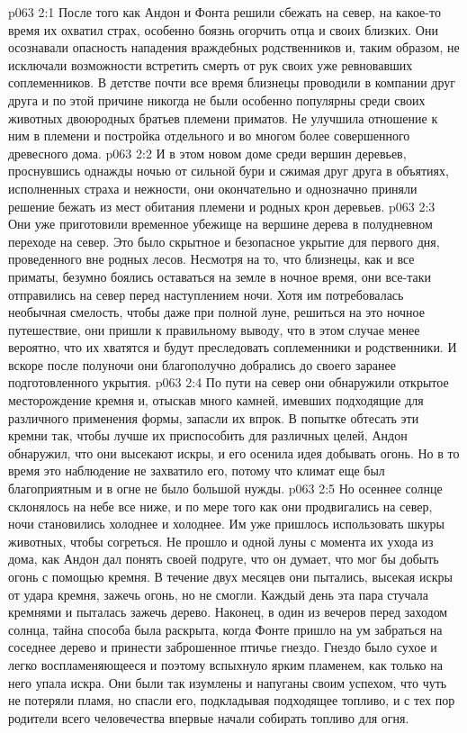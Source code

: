 \vs p063 2:1 После того как Андон и Фонта решили сбежать на север, на какое\hyp{}то время их охватил страх, особенно боязнь огорчить отца и своих близких. Они осознавали опасность нападения враждебных родственников и, таким образом, не исключали возможности встретить смерть от рук своих уже ревновавших соплеменников. В детстве почти все время близнецы проводили в компании друг друга и по этой причине никогда не были особенно популярны среди своих животных двоюродных братьев племени приматов. Не улучшила отношение к ним в племени и постройка отдельного и во многом более совершенного древесного дома.
\vs p063 2:2 И в этом новом доме среди вершин деревьев, проснувшись однажды ночью от сильной бури и сжимая друг друга в объятиях, исполненных страха и нежности, они окончательно и однозначно приняли решение бежать из мест обитания племени и родных крон деревьев.
\vs p063 2:3 Они уже приготовили временное убежище на вершине дерева в полудневном переходе на север. Это было скрытное и безопасное укрытие для первого дня, проведенного вне родных лесов. Несмотря на то, что близнецы, как и все приматы, безумно боялись оставаться на земле в ночное время, они все\hyp{}таки отправились на север перед наступлением ночи. Хотя им потребовалась необычная смелость, чтобы даже при полной луне, решиться на это ночное путешествие, они пришли к правильному выводу, что в этом случае менее вероятно, что их хватятся и будут преследовать соплеменники и родственники. И вскоре после полуночи они благополучно добрались до своего заранее подготовленного укрытия.
\vs p063 2:4 По пути на север они обнаружили открытое месторождение кремня и, отыскав много камней, имевших подходящие для различного применения формы, запасли их впрок. В попытке обтесать эти кремни так, чтобы лучше их приспособить для различных целей, Андон обнаружил, что они высекают искры, и его осенила идея добывать огонь. Но в то время это наблюдение не захватило его, потому что климат еще был благоприятным и в огне не было большой нужды.
\vs p063 2:5 Но осеннее солнце склонялось на небе все ниже, и по мере того как они продвигались на север, ночи становились холоднее и холоднее. Им уже пришлось использовать шкуры животных, чтобы согреться. Не прошло и одной луны с момента их ухода из дома, как Андон дал понять своей подруге, что он думает, что мог бы добыть огонь с помощью кремня. В течение двух месяцев они пытались, высекая искры от удара кремня, зажечь огонь, но не смогли. Каждый день эта пара стучала кремнями и пыталась зажечь дерево. Наконец, в один из вечеров перед заходом солнца, тайна способа была раскрыта, когда Фонте пришло на ум забраться на соседнее дерево и принести заброшенное птичье гнездо. Гнездо было сухое и легко воспламеняющееся и поэтому вспыхнуло ярким пламенем, как только на него упала искра. Они были так изумлены и напуганы своим успехом, что чуть не потеряли пламя, но спасли его, подкладывая подходящее топливо, и с тех пор родители всего человечества впервые начали собирать топливо для огня.
